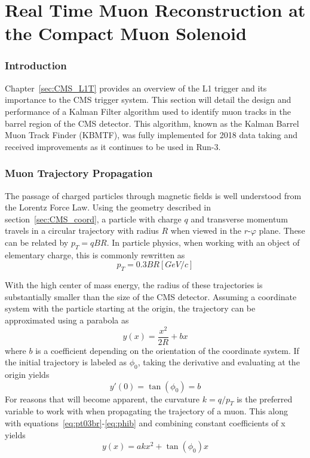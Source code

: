 
\chapter{Real Time Muon Reconstruction at the Compact Muon Solenoid}
\label{chap:kbmtf}

\subsection{Introduction} \label{sec:kbmtf_intro}
Chapter~\ref{sec:CMS_L1T} provides an overview of the L1 trigger and its importance to the CMS trigger system. This section will detail the design and performance of a Kalman Filter algorithm used to identify muon tracks in the barrel region of the CMS detector. This algorithm, known as the Kalman Barrel Muon Track Finder (KBMTF), was fully implemented for 2018 data taking and received improvements as it continues to be used in Run-3.

\subsection{Muon Trajectory Propagation}
The passage of charged particles through magnetic fields is well understood from the Lorentz Force Law. Using the geometry described in section~\ref{sec:CMS_coord}, a particle with charge $q$ and transverse momentum travels in a circular trajectory with radius $R$ when viewed in the $r$-$\varphi$ plane. These can be related by $p_{T} = qBR$. In particle physics, when working with an object of elementary charge, this is commonly rewritten as
\begin{equation}
	\label{eq:pt03br}
	p_{T} = 0.3BR\unit{\left[GeV/c\right]}
\end{equation} 

With the high center of mass energy, the radius of these trajectories is substantially smaller than the size of the CMS detector. Assuming a coordinate system with the particle starting at the origin, the trajectory can be approximated using a parabola as
\begin{equation}
	\label{eq:parabola1}
	y(x)=\frac{x^2}{2R}+bx
\end{equation}
where $b$ is a coefficient depending on the orientation of the coordinate system. If the initial trajectory is labeled as $\phi_0$, taking the derivative and evaluating at the origin yields
\begin{equation}
	\label{eq:phib}
	y'(0)=\tan(\phi_0)=b
\end{equation}	
For reasons that will become apparent, the curvature $k=q/p_{T}$ is the preferred variable to work with when propagating the trajectory of a muon. This along with equations~\ref{eq:pt03br}-\ref{eq:phib} and combining constant coefficients of x yields
\begin{equation}
	y(x)=akx^2+\tan(\phi_0)x
\end{equation}

